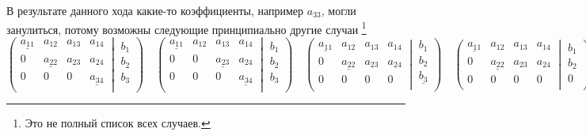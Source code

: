 В результате данного хода какие-то коэффициенты, например $a_{33}$, могли занулиться, потому возможны следующие принципиально другие случаи%
\footnote{Это не полный список всех случаев.}
\[
\left(\left.
\begin{matrix}
\underline{a_{11}}& a_{12}&a_{13}& a_{14}\\
0& \underline{a_{22}}&a_{23}& a_{24}\\
0& 0&0& \underline{a_{34}}\\
\end{matrix}
\:\right|\:
\begin{matrix}
b_1\\
b_2\\
b_3\\
\end{matrix}
\right)
\quad
\left(\left.
\begin{matrix}
\underline{a_{11}}& a_{12}&a_{13}& a_{14}\\
0& 0&\underline{a_{23}}& a_{24}\\
0& 0&0& \underline{a_{34}}\\
\end{matrix}
\:\right|\:
\begin{matrix}
b_1\\
b_2\\
b_3\\
\end{matrix}
\right)
\quad
\left(\left.
\begin{matrix}
\underline{a_{11}}& a_{12}&a_{13}& a_{14}\\
0& \underline{a_{22}}&a_{23}& a_{24}\\
0& 0&0& 0\\
\end{matrix}
\:\right|\:
\begin{matrix}
b_1\\
b_2\\
\underline{b_3}\\
\end{matrix}
\right)
\quad
\left(\left.
\begin{matrix}
\underline{a_{11}}& a_{12}&a_{13}& a_{14}\\
0& \underline{a_{22}}&a_{23}& a_{24}\\
0& 0&0& 0\\
\end{matrix}
\:\right|\:
\begin{matrix}
b_1\\
b_2\\
0\\
\end{matrix}
\right)
\]

